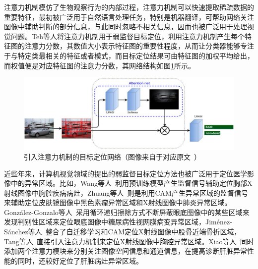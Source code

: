 注意力机制模仿了生物观察行为的内部过程，注意力机制可以快速提取稀疏数据的重要特征，最初被广泛用于自然语言处理任务，特别是机器翻译，可帮助网络关注图像中辅助判断的部分信息，与此同时忽略不相关信息，因而也被广泛用于处理视觉问题。Teh等人\cite{BMVC2016_52}将注意力机制用于弱监督目标定位，利用注意力机制产生每个特征图的注意力分数，其数值大小表示特征图的重要性程度，从而让分类器能够专注于与特定类最相关的特征或者模式，而目标定位结果可由特征图的加权平均给出，而权值便是对应特征图的注意力分数，其网络结构如图\ref{fig:attention_weakly_supervised_object_localization}所示。
\begin{figure}[h]
	\centering
	\includegraphics[width=1.0\textwidth]{figure/attention_weakly_supervised_object_localization}
	\caption{引入注意力机制的目标定位网络（图像来自于对应原文~\cite{BMVC2016_52}）}
	\label{fig:attention_weakly_supervised_object_localization}
\end{figure}

近些年来，计算机视觉领域的提出的弱监督目标定位方法也被广泛用于定位医学影像中的异常区域。比如，Wang等人~\cite{WangPLLBS17}利用预训练模型产生监督信号辅助定位胸部X射线图像中胸腔疾病病灶，Zhuang等人~\cite{zhuang2019care}则是利用CAM产生异常区域的监督信号来辅助定位皮肤镜图像中黑色素瘤异常区域和X射线图像中肺炎异常区域。Gonz{\'a}lez-Gonzalo等人~\cite{GonzlezGonzalo2018ImprovingWL}采用循环递归擦除方式不断屏蔽眼底图像中的某些区域来发现判别性区域来定位眼底图像中糖尿病性视网膜病变异常区域，Jim{\'e}nez-S{\'a}nchez等人~\cite{JimnezSnchez2018WeaklySupervisedLA}整合了自迁移学习和CAM定位X射线图像中股骨近端骨折区域，Tang等人~\cite{Tang2018AttentionGuidedCL}直接引入注意力机制来定位X射线图像中胸腔异常区域。Xiao等人~\cite{chen2019cascade}同时添加两个注意力模块来分别关注图像空间信息和通道信息，在提高诊断肝脏异常性能的同时，还较好定位了肝脏病灶异常区域。

